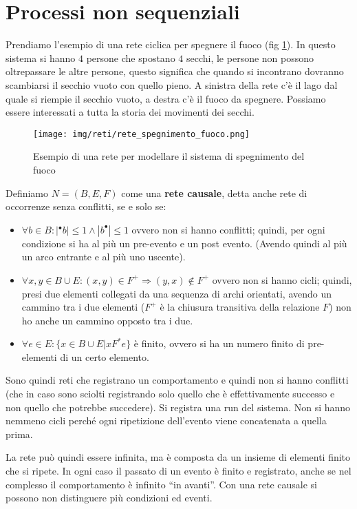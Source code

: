 \section{Processi non sequenziali}
Prendiamo l'esempio di una rete ciclica per spegnere il fuoco (fig \ref{fig:spegnimento-fuoco}).
In questo sistema si hanno $4$ persone che spostano $4$ secchi, le persone non possono
oltrepassare le altre persone, questo significa che quando si incontrano dovranno
scambiarsi il secchio vuoto con quello pieno. A sinistra della rete c'è il lago dal quale
si riempie il secchio vuoto, a destra c'è il fuoco da spegnere. Possiamo essere
interessati a tutta la storia dei movimenti dei secchi.
\begin{figure}[!ht]
    \centering
    \texttt{[image: img/reti/rete\_spegnimento\_fuoco.png]}
    \caption{Esempio di una rete per modellare il sistema di spegnimento del fuoco}
    \label{fig:spegnimento-fuoco}
\end{figure}
\begin{definizione}
    Definiamo $N = (B,E, F)$ come una \textbf{rete causale}, detta anche rete di
    occorrenze senza conflitti, se e solo se:
    \begin{itemize}
        \item $\forall b \in B: |^{\bullet}b| \leq 1 \land |b^{\bullet}| \leq 1$
              ovvero non si hanno conflitti; quindi, per ogni condizione si ha al più
              un pre-evento e un post evento. (Avendo quindi al più un arco entrante
              e al più uno uscente).
        \item $\forall x, y \in B \cup E: (x, y) \in F^{+} \Rightarrow (y, x) \notin F^{+}$
              ovvero non si hanno cicli; quindi, presi due elementi collegati da una
              sequenza di archi orientati, avendo un cammino tra i due elementi ($F^{+}$
              è la chiusura transitiva della relazione $F$) non ho anche un cammino
              opposto tra i due.
        \item $\forall e \in E: \{x \in B \cup E | xF^{\ast}e\}$ è finito, ovvero
              si ha un numero finito di pre-elementi di un certo elemento.
    \end{itemize}
    Sono quindi reti che registrano un comportamento e quindi non si hanno
    conflitti (che in caso sono sciolti registrando solo quello che è effettivamente
    successo e non quello che potrebbe succedere). Si registra una run del sistema.
    Non si hanno nemmeno cicli perché ogni ripetizione dell'evento viene concatenata
    a quella prima.

    La rete può quindi essere infinita, ma è composta da un insieme di elementi
    finito che si ripete. In ogni caso il passato di un evento è finito e registrato,
    anche se nel complesso il comportamento è infinito “in avanti”. Con una rete
    causale si possono non distinguere più condizioni ed eventi.
\end{definizione}
